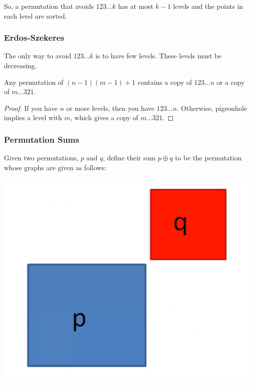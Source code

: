 \documentclass[letterpaper]{article}
\begin{document}
So, a permutation that avoids $123\dots k$ has at most $k - 1$ levels and the points in each level are sorted. 

\subsubsection{Erdos-Szekeres}
The only way to avoid $123\dots k$ is to have few levels. These levels must be decreasing. 

\begin{theorem}{}{}
    Any permutation of $(n - 1)(m - 1) + 1$ contains a copy of $123\dots n$ or a copy of $m\dots 321$. 
\end{theorem}

\begin{proof}
    If you have $n$ or more levels, then you have $123\dots n$. Otherwise, pigeonhole implies a level with $m$, which gives a copy of $m\dots 321$. 
\end{proof}

\subsubsection{Permutation Sums}
\begin{definition}{}{}
    Given two permutations, $p$ and $q$, define their sum $p \oplus q$ to be the permutation whose graphs are given as follows:
    \begin{center}
        \includegraphics[scale=0.5]{p_sum.PNG}
    \end{center}
\end{definition}
\end{document}
